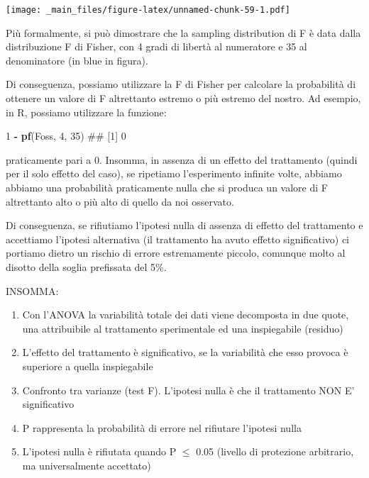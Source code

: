 \documentclass[a4paper,12pt,oneside]{book}
\providecommand{\tightlist}{%
  \setlength{\itemsep}{0pt}\setlength{\parskip}{0pt}}
\newenvironment{Shaded}{\begin{snugshade}}{\end{snugshade}}
\newcommand{\KeywordTok}[1]{\textcolor[rgb]{0.13,0.29,0.53}{\textbf{#1}}}
\newcommand{\DecValTok}[1]{\textcolor[rgb]{0.00,0.00,0.81}{#1}}
\newcommand{\StringTok}[1]{\textcolor[rgb]{0.31,0.60,0.02}{#1}}
\newcommand{\OperatorTok}[1]{\textcolor[rgb]{0.81,0.36,0.00}{\textbf{#1}}}
\newcommand{\NormalTok}[1]{#1}
\theoremstyle{definition}
\theoremstyle{definition}
\theoremstyle{definition}
\theoremstyle{remark}
\begin{document}
\texttt{[image: \_main\_files/figure-latex/unnamed-chunk-59-1.pdf]}

Più formalmente, si può dimostrare che la sampling distribution di F è
data dalla distribuzione F di Fisher, con 4 gradi di libertà al
numeratore e 35 al denominatore (in blue in figura).

Di conseguenza, possiamo utilizzare la F di Fisher per calcolare la
probabilità di ottenere un valore di F altrettanto estremo o più estremo
del nostro. Ad esempio, in R, possiamo utilizzare la funzione:

\begin{Shaded}
\begin{Highlighting}[]
\DecValTok{1} \OperatorTok{-}\StringTok{ }\KeywordTok{pf}\NormalTok{(Foss, }\DecValTok{4}\NormalTok{, }\DecValTok{35}\NormalTok{)}
\NormalTok{## [1] 0}
\end{Highlighting}
\end{Shaded}

praticamente pari a 0. Insomma, in assenza di un effetto del trattamento
(quindi per il solo effetto del caso), se ripetiamo l'esperimento
infinite volte, abbiamo abbiamo una probabilità praticamente nulla che
si produca un valore di F altrettanto alto o più alto di quello da noi
osservato.

Di conseguenza, se rifiutiamo l'ipotesi nulla di assenza di effetto del
trattamento e accettiamo l'ipotesi alternativa (il trattamento ha avuto
effetto significativo) ci portiamo dietro un rischio di errore
estremamente piccolo, comunque molto al disotto della soglia prefissata
del 5\%.

INSOMMA:

\begin{enumerate}
\def\labelenumi{\arabic{enumi}.}
\tightlist
\item
  Con l'ANOVA la variabilità totale dei dati viene decomposta in due
  quote, una attribuibile al trattamento sperimentale ed una
  inspiegabile (residuo)
\item
  L'effetto del trattamento è significativo, se la variabilità che esso
  provoca è superiore a quella inspiegabile
\item
  Confronto tra varianze (test F). L'ipotesi nulla è che il trattamento
  NON E' significativo
\item
  P rappresenta la probabilità di errore nel rifiutare l'ipotesi nulla
\item
  L'ipotesi nulla è rifiutata quando P \(\leq\) 0.05 (livello di
  protezione arbitrario, ma universalmente accettato)
\end{enumerate}
\end{document}
